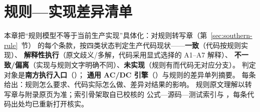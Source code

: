 \section{规则—实现差异清单}\label{sec:rule-gaps}

\begin{theorynote}
本章把“规则模型不等于当前生产实现”具体化：对规则转写章（第~\ref{sec:southern-rule}~节）
的每个条款，按四类状态判定生产代码现状——\textbf{一致}（代码按规则实现）、
\textbf{解释性执行}（原文歧义/多解，代码采用显式选择的 A1--A7 解释）、
\textbf{不一致/偏离}（实现与规则文字明确不同）、\textbf{未实现}（规则有而代码无对应分支）。
判定对象是\textbf{南方执行入口}（）；
\textbf{通用 AC/DC 引擎}（）与规则的差异单列摘要。
每条给出：规则怎么要求、代码实际怎么做、差异对结果的影响。
规则原文理解以转写章与附录原页为准；索引骨架取自已校核的
 公式—源码—测试索引与
，每条代码出处均已重新打开核实。
\end{theorynote}

